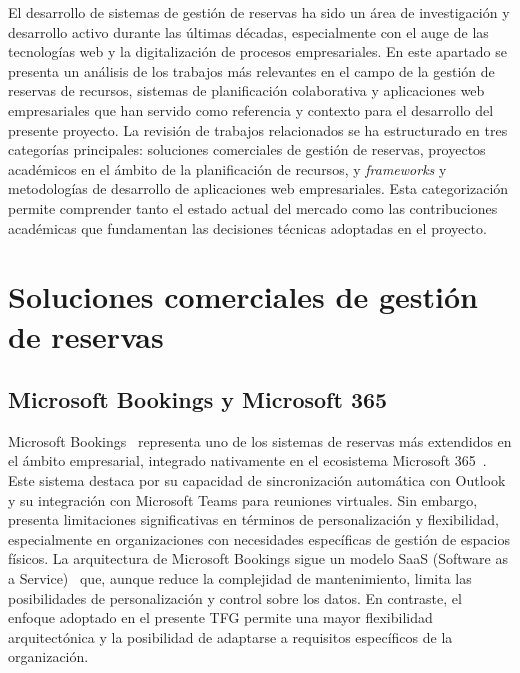 
El desarrollo de sistemas de gestión de reservas ha sido un área de investigación y desarrollo activo durante las últimas décadas, especialmente con el auge de las tecnologías web y la digitalización de procesos empresariales. En este apartado se presenta un análisis de los trabajos más relevantes en el campo de la gestión de reservas de recursos, sistemas de planificación colaborativa y aplicaciones web empresariales que han servido como referencia y contexto para el desarrollo del presente proyecto.
La revisión de trabajos relacionados se ha estructurado en tres categorías principales: soluciones comerciales de gestión de reservas, proyectos académicos en el ámbito de la planificación de recursos, y \emph{frameworks} y metodologías de desarrollo de aplicaciones web empresariales. Esta categorización permite comprender tanto el estado actual del mercado como las contribuciones académicas que fundamentan las decisiones técnicas adoptadas en el proyecto.\\

\section{Soluciones comerciales de gestión de reservas}\label{soluciones-comerciales-gestion-reservas}
\subsection{Microsoft Bookings y Microsoft 365}\label{microsoft-booking-microsoft-365}
Microsoft Bookings~\cite{microsoft-booking} representa uno de los sistemas de reservas más extendidos en el ámbito empresarial, integrado nativamente en el ecosistema Microsoft 365~\cite{microsoft-365}. Este sistema destaca por su capacidad de sincronización automática con Outlook y su integración con Microsoft Teams para reuniones virtuales. Sin embargo, presenta limitaciones significativas en términos de personalización y flexibilidad, especialmente en organizaciones con necesidades específicas de gestión de espacios físicos.
La arquitectura de Microsoft Bookings sigue un modelo SaaS (Software as a Service)~\cite{saas} que, aunque reduce la complejidad de mantenimiento, limita las posibilidades de personalización y control sobre los datos. En contraste, el enfoque adoptado en el presente TFG permite una mayor flexibilidad arquitectónica y la posibilidad de adaptarse a requisitos específicos de la organización.\\

